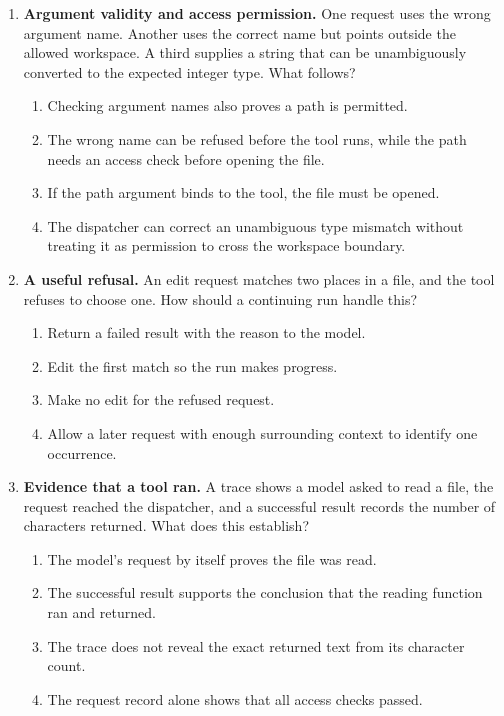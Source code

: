 \begin{enumerate}[start=31,itemsep=0.7\baselineskip]
\item\label{exercise:35} \begin{minipage}[t]{\linewidth}
\textbf{Argument validity and access permission.} One request uses the wrong argument name. Another uses the correct name but points outside the allowed workspace. A third supplies a string that can be unambiguously converted to the expected integer type. What follows?
\begin{enumerate}[label=\textnormal{(\Alph*)},leftmargin=*,itemsep=0pt]
\item Checking argument names also proves a path is permitted.
\item The wrong name can be refused before the tool runs, while the path needs an access check before opening the file.
\item If the path argument binds to the tool, the file must be opened.
\item The dispatcher can correct an unambiguous type mismatch without treating it as permission to cross the workspace boundary.
\end{enumerate}
\end{minipage}

\item\label{exercise:36} \begin{minipage}[t]{\linewidth}
\textbf{A useful refusal.} An edit request matches two places in a file, and the tool refuses to choose one. How should a continuing run handle this?
\begin{enumerate}[label=\textnormal{(\Alph*)},leftmargin=*,itemsep=0pt]
\item Return a failed result with the reason to the model.
\item Edit the first match so the run makes progress.
\item Make no edit for the refused request.
\item Allow a later request with enough surrounding context to identify one occurrence.
\end{enumerate}
\end{minipage}

\item\label{exercise:37} \begin{minipage}[t]{\linewidth}
\textbf{Evidence that a tool ran.} A trace shows a model asked to read a file, the request reached the dispatcher, and a successful result records the number of characters returned. What does this establish?
\begin{enumerate}[label=\textnormal{(\Alph*)},leftmargin=*,itemsep=0pt]
\item The model's request by itself proves the file was read.
\item The successful result supports the conclusion that the reading function ran and returned.
\item The trace does not reveal the exact returned text from its character count.
\item The request record alone shows that all access checks passed.
\end{enumerate}
\end{minipage}


\end{enumerate}
